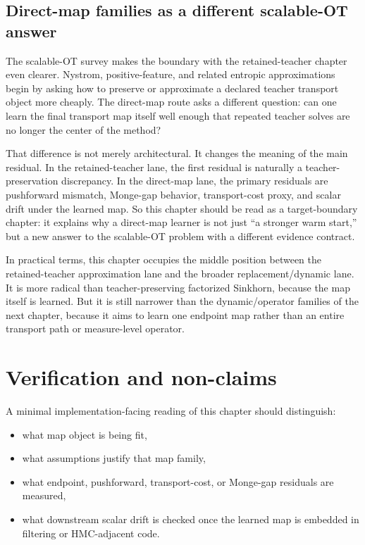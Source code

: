 \subsection{Direct-map families as a different scalable-OT answer}
\label{sec:bf-neural-ot-direct-scalable-boundary}

The scalable-OT survey makes the boundary with the retained-teacher chapter even
clearer.  Nystrom, positive-feature, and related entropic approximations begin by
asking how to preserve or approximate a declared teacher transport object more
cheaply.  The direct-map route asks a different question: can one learn the final
transport map itself well enough that repeated teacher solves are no longer the
center of the method?

That difference is not merely architectural.  It changes the meaning of the main
residual.  In the retained-teacher lane, the first residual is naturally a
teacher-preservation discrepancy.  In the direct-map lane, the primary residuals
are pushforward mismatch, Monge-gap behavior, transport-cost proxy, and scalar
drift under the learned map.  So this chapter should be read as a target-boundary
chapter: it explains why a direct-map learner is not just ``a stronger warm
start,'' but a new answer to the scalable-OT problem with a different evidence
contract.

In practical terms, this chapter occupies the middle position between the
retained-teacher approximation lane and the broader replacement/dynamic lane.  It
is more radical than teacher-preserving factorized Sinkhorn, because the map
itself is learned.  But it is still narrower than the dynamic/operator families of
the next chapter, because it aims to learn one endpoint map rather than an entire
transport path or measure-level operator.

\section{Verification and non-claims}
\label{sec:bf-neural-ot-direct-verification}

A minimal implementation-facing reading of this chapter should distinguish:
\begin{itemize}
  \item what map object is being fit,
  \item what assumptions justify that map family,
  \item what endpoint, pushforward, transport-cost, or Monge-gap residuals are
  measured,
  \item what downstream scalar drift is checked once the learned map is embedded
  in filtering or HMC-adjacent code.
\end{itemize}

